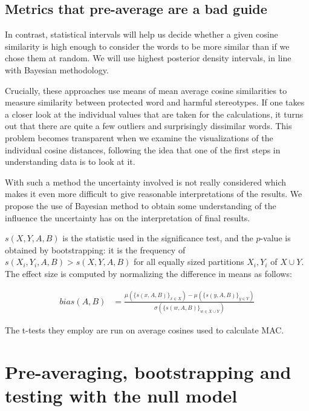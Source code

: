 \documentclass[
  10pt,
  dvipsnames,enabledeprecatedfontcommands]{scrartcl}
\begin{document}
\hypertarget{metrics-that-pre-average-are-a-bad-guide}{%
\subsection{Metrics that pre-average are a bad
guide}\label{metrics-that-pre-average-are-a-bad-guide}}

In contrast, statistical intervals will help us decide whether a given
cosine similarity is high enough to consider the words to be more
similar than if we chose them at random. We will use highest posterior
density intervals, in line with Bayesian methodology.

Crucially, these approaches use means of mean average cosine
similarities to measure similarity between protected word and harmful
stereotypes. If one takes a closer look at the individual values that
are taken for the calculations, it turns out that there are quite a few
outliers and surprisingly dissimilar words. This problem becomes
transparent when we examine the visualizations of the individual cosine
distances, following the idea that one of the first steps in
understanding data is to look at it.

With such a method the uncertainty involved is not really considered
which makes it even more difficult to give reasonable interpretations of
the results. We propose the use of Bayesian method to obtain some
understanding of the influence the uncertainty has on the interpretation
of final results.

\noindent \(s(X,Y,A,B)\) is the statistic used in the significance test,
and the \(p\)-value is obtained by bootstrapping: it is the frequency of
\(s(X_i,Y_i,A,B)>s(X,Y,A,B)\) for all equally sized partitions
\(X_i, Y_i\) of \(X\cup Y\). The effect size is computed by normalizing
the difference in means as follows:

\vspace{-2mm}

\footnotesize

\begin{align}
bias(A,B) & = \frac{
\mu(\{s(x,A,B)\}_{x\in X}) -\mu(\{s(y,A,B)\}_{y\in Y}) 
}{
\sigma(\{s(w,A,B)\}_{w\in X\cup Y})
}
\end{align}

\normalsize

The t-tests they employ are run on average cosines used to calculate
MAC.

\hypertarget{pre-averaging-bootstrapping-and-testing-with-the-null-model}{%
\section{Pre-averaging, bootstrapping and testing with the null
model}\label{pre-averaging-bootstrapping-and-testing-with-the-null-model}}
\end{document}
